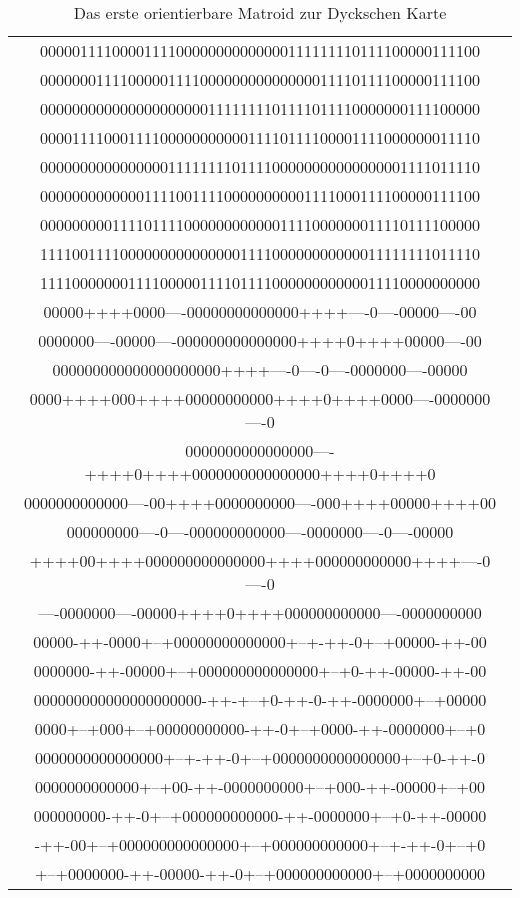 \begin{table}%
{\tt
\begin{center}
\begin{tabular}{c}
0000011110000111100000000000000111111110111100000111100\\
0000000111100000111100000000000000011110111100000111100\\
0000000000000000000001111111101111011110000000111100000\\
0000111100011110000000000011110111100001111000000011110\\
0000000000000000111111110111100000000000000001111011110\\
0000000000000111100111100000000001111000111100000111100\\
0000000001111011110000000000001111000000011110111100000\\
1111001111000000000000000111100000000000011111111011110\\
1111000000011110000011110111100000000000011110000000000\\[2mm]
00000++++0000----00000000000000++++----0----00000----00\\
0000000----00000----000000000000000++++0++++00000----00\\
000000000000000000000++++----0----0----0000000----00000\\
0000++++000++++00000000000++++0++++0000----0000000----0\\
0000000000000000----++++0++++0000000000000000++++0++++0\\
0000000000000----00++++0000000000----000++++00000++++00\\
000000000----0----000000000000----0000000----0----00000\\
++++00++++000000000000000++++000000000000++++----0----0\\
----0000000----00000++++0++++000000000000----0000000000\\[2mm]
00000-++-0000+--+00000000000000+--+-++-0+--+00000-++-00\\
0000000-++-00000+--+000000000000000+--+0-++-00000-++-00\\
000000000000000000000-++-+--+0-++-0-++-0000000+--+00000\\
0000+--+000+--+00000000000-++-0+--+0000-++-0000000+--+0\\
0000000000000000+--+-++-0+--+0000000000000000+--+0-++-0\\
0000000000000+--+00-++-0000000000+--+000-++-00000+--+00\\
000000000-++-0+--+000000000000-++-0000000+--+0-++-00000\\
-++-00+--+000000000000000+--+000000000000+--+-++-0+--+0\\
+--+0000000-++-00000-++-0+--+000000000000+--+0000000000\\
\end{tabular}
\end{center}
}
\caption{\label{dyckori1}Das erste orientierbare Matroid zur Dyckschen Karte}
\end{table}

